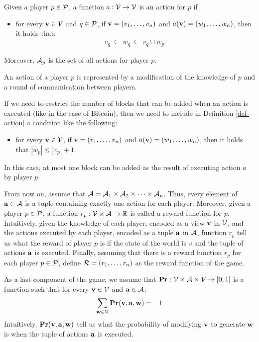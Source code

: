 
\begin{mydef}\label{def-action}
Given a player $p \in \mathcal{P}$, a function $a : \mathcal{V} \to \mathcal{V}$ is an action for $p$ if
\begin{itemize}
\item for every $\mathbf{v} \in \mathcal{V}$ and $q \in \mathcal{P}$, if $\mathbf{v} = (v_1, \ldots, v_n)$ and $a(\mathbf{v}) = (w_1, \ldots, w_n)$, then it holds that:
\begin{eqnarray*}
v_q \ \subseteq \ w_q \ \subseteq \ v_q \cup w_p.
\end{eqnarray*}

\end{itemize}
Moreover, $\mathcal{A}_p$ is the set of all actions for player $p$.
\end{mydef}
An action of a player $p$ is represented by a modification of the knowledge of $p$ and a round of communication between players. 

If we need to restrict the number of blocks that can be added when an action is executed (like in the case of Bitcoin), then we need to include in Definition \ref{def-action} a condition like the following:
\begin{itemize}
\item for every $\mathbf{v} \in \mathcal{V}$, if $\mathbf{v} = (v_1, \ldots, v_n)$ and $a(\mathbf{v}) = (w_1, \ldots, w_n)$, then it holds that $|w_p| \leq |v_p| + 1$.
\end{itemize}
In this case, at most one block can be added as the result of executing action $a$ by player $p$. 

From now on, assume that $\mathcal{A} = \mathcal{A}_{1} \times \mathcal{A}_{2} \times \cdots \times \mathcal{A}_{n}$. Thus, every element of $\mathbf{a} \in \mathcal{A}$ is a tuple containing exactly one action for each player. Moreover, given a player $p \in \mathcal{P}$, a function $r_p : \mathcal{V} \times \mathcal{A} \to \mathbb{R}$ is called a reward function for $p$. Intuitively, given the knowledge of each player, encoded as a view $\mathbf{v}$ in $\mathcal{V}$, and the actions executed by each player, encoded as a tuple $\mathbf{a}$ in $\mathcal{A}$, function $r_p$ tell us what the reward of player $p$ is if the state of the world is $v$ and the tuple of actions $\mathbf{a}$ is executed. Finally, assuming that there is a reward function $r_p$ for each player $p \in \mathcal{P}$, define $\mathcal{R} = (r_1, \ldots, r_n)$ as the reward function of the game.

As a last component of the game, we assume that $\mathbf{Pr} : \mathcal{V} \times \mathcal{A} \times \mathcal{V} \to [0,1]$ is a function such that 
for every $\mathbf{v} \in \mathcal{V}$ and $\mathbf{a} \in \mathcal{A}$:
\begin{eqnarray*}
\sum_{\mathbf{w} \in \mathcal{V}} \mathbf{Pr}(\mathbf{v}, \mathbf{a}, \mathbf{w}) & = & 1
\end{eqnarray*}
Intuitively, $\mathbf{Pr}(\mathbf{v}, \mathbf{a}, \mathbf{w})$ tell us what the probability of modifying $\mathbf{v}$ to generate $\mathbf{w}$ is when the tuple of actions $\mathbf{a}$ is executed.



